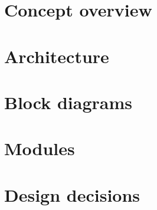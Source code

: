 \section{Concept overview}


\section{Architecture}


\section{Block diagrams}

\section{Modules}

\section{Design decisions}


